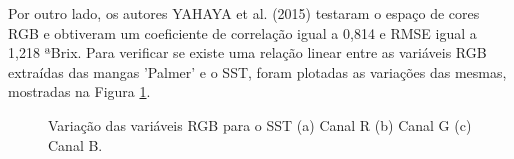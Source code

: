 Por outro lado, os autores YAHAYA et al. (2015) testaram o espaço de cores RGB e obtiveram um coeficiente de correlação igual a 0,814 e RMSE igual a 1,218 ªBrix. Para verificar se existe uma relação linear entre as variáveis RGB extraídas das mangas 'Palmer' e o SST, foram plotadas as variações das mesmas, mostradas na Figura \ref{fig:rgb_sst}.

\begin{figure}[H]
\centering
    \caption{\label{fig:rgb_sst} Variação das variáveis RGB para o SST (a) Canal R (b) Canal G (c) Canal B.}

\end{figure}
